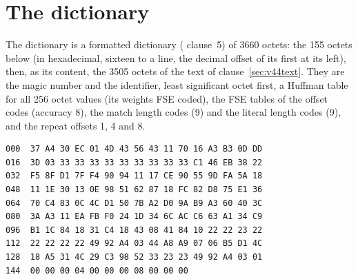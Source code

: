 \section{The dictionary}\label{sec:zstddict}
The dictionary  is a formatted dictionary (
clause~5) of 3660 octets: the 155 octets below (in hexadecimal, sixteen
to a line, the decimal offset of its first at its left), then, as its content,
the 3505 octets of the text of clause~\ref{sec:v44text}.  They are the
magic number  and the identifier, least significant
octet first, a Huffman table for all 256 octet values (its weights FSE
coded), the FSE tables of the offset codes (accuracy 8), the match
length codes (9) and the literal length codes (9), and the repeat
offsets 1, 4 and 8.
{\footnotesize
\begin{verbatim}
000  37 A4 30 EC 01 4D 43 56 43 11 70 16 A3 B3 0D DD
016  3D 03 33 33 33 33 33 33 33 33 33 C1 46 EB 38 22
032  F5 8F D1 7F F4 90 94 11 17 CE 90 55 9D FA 5A 18
048  11 1E 30 13 0E 98 51 62 87 18 FC 82 D8 75 E1 36
064  70 C4 83 0C 4C D1 50 7B A2 D0 9A B9 A3 60 40 3C
080  3A A3 11 EA FB F0 24 1D 34 6C AC C6 63 A1 34 C9
096  B1 1C 84 18 31 C4 18 43 08 41 84 10 22 22 23 22
112  22 22 22 22 49 92 A4 03 44 A8 A9 07 06 B5 D1 4C
128  18 A5 31 4C 29 C3 98 52 33 23 23 49 92 A4 03 01
144  00 00 00 04 00 00 00 08 00 00 00
\end{verbatim}
}
